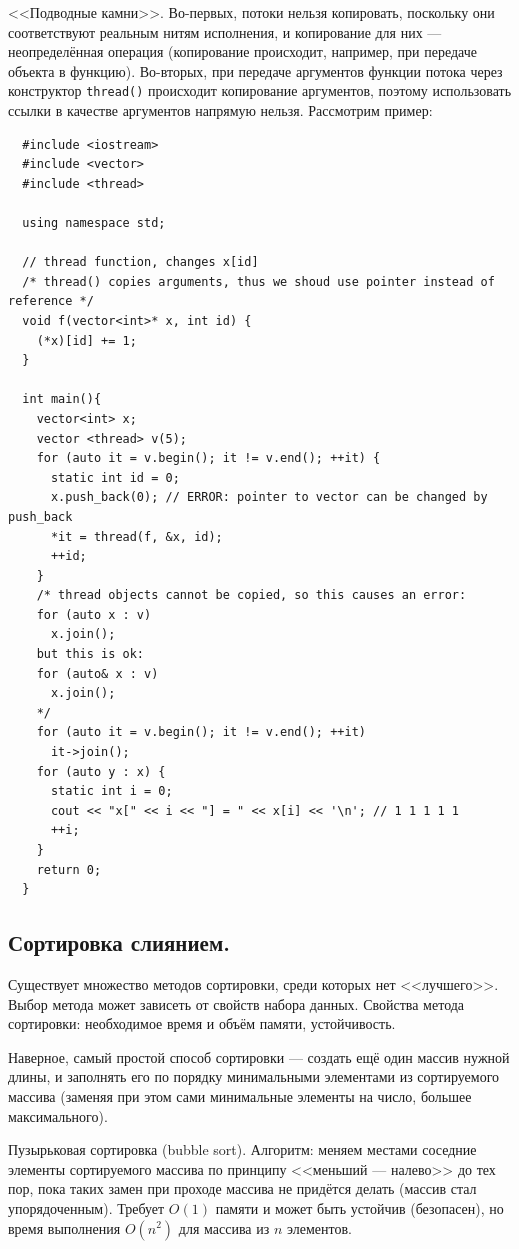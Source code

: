 \documentclass{book}
\begin{document}
<<Подводные камни>>. Во-первых, потоки нельзя копировать, поскольку они
соответствуют реальным нитям исполнения, и копирование для них ---
неопределённая операция (копирование происходит, например, при передаче объекта
в функцию). Во-вторых, при передаче аргументов функции потока через конструктор
\texttt{thread()} происходит копирование аргументов, поэтому
использовать ссылки в качестве аргументов напрямую нельзя. Рассмотрим пример:
\begin{verbatim}
  #include <iostream>
  #include <vector>
  #include <thread>

  using namespace std;

  // thread function, changes x[id]
  /* thread() copies arguments, thus we shoud use pointer instead of reference */
  void f(vector<int>* x, int id) {
    (*x)[id] += 1;
  }

  int main(){
    vector<int> x;
    vector <thread> v(5);
    for (auto it = v.begin(); it != v.end(); ++it) {
      static int id = 0;
      x.push_back(0); // ERROR: pointer to vector can be changed by push_back
      *it = thread(f, &x, id);
      ++id;
    }
    /* thread objects cannot be copied, so this causes an error:
    for (auto x : v)
      x.join();
    but this is ok:
    for (auto& x : v)
      x.join();
    */
    for (auto it = v.begin(); it != v.end(); ++it)
      it->join();
    for (auto y : x) {
      static int i = 0;
      cout << "x[" << i << "] = " << x[i] << '\n'; // 1 1 1 1 1
      ++i;
    }
    return 0;
  }
\end{verbatim}

\subsection{Сортировка слиянием.}

Существует множество методов сортировки, среди которых нет <<лучшего>>. Выбор
метода может зависеть от свойств набора данных. Свойства метода сортировки:
необходимое время и объём памяти, устойчивость.

Наверное, самый простой способ сортировки --- создать ещё один массив нужной длины, и заполнять его
по порядку минимальными элементами из сортируемого массива (заменяя при этом сами минимальные
элементы на число, большее максимального).
 
Пузырьковая сортировка (bubble sort). Алгоритм: меняем местами соседние элементы
сортируемого массива по принципу <<меньший --- налево>> до тех пор, пока таких
замен при проходе массива не придётся делать (массив стал упорядоченным).
Требует $O(1)$ памяти и может быть устойчив (безопасен), но время выполнения
$O(n^2)$ для массива из $n$ элементов.
\end{document}
